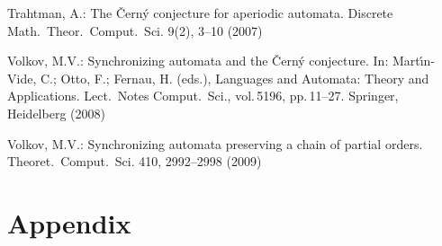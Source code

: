 \documentclass[11pt]{llncs}
\begin{document}
\begin{thebibliography}{99}
Trahtman, A.: The \v{C}ern\'y conjecture for aperiodic automata.
Discrete Math.\ Theor.\ Comput.\ Sci. 9(2), 3--10 (2007)

Volkov, M.V.: Synchronizing automata and the \v{C}ern\'{y}
conjecture. In: Mart\'\i{}n-Vide, C.; Otto, F.; Fernau, H. (eds.),
Languages and Automata: Theory and Applications. Lect.\ Notes
Comput.\ Sci., vol.\,5196, pp.\,11--27.  Springer, Heidelberg (2008)

Volkov, M.V.: Synchronizing automata preserving a chain of partial
orders. Theoret.\ Comput.\ Sci. 410, 2992--2998 (2009)
\end{thebibliography}


\section*{Appendix}
\end{document}

